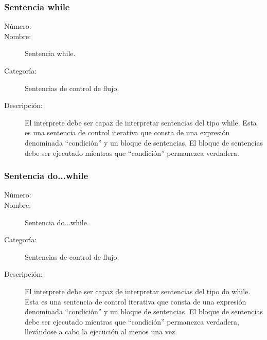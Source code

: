 \subsubsection{Sentencia while}
\begin{framed}
	\begin{description}
		\item [Número:] \cn
		\item [Nombre:] Sentencia while.
		\item [Categoría:] Sentencias de control de flujo.
		\item [Descripción:] El interprete debe ser capaz de interpretar sentencias del tipo while. Esta es una sentencia de control
		iterativa que consta de una expresión denominada ``condición'' y un bloque de sentencias. El bloque de sentencias debe ser ejecutado
	    mientras que ``condición'' permanezca verdadera.
	\end {description}
\end{framed}

\subsubsection{Sentencia do...while}
\begin{framed}
	\begin{description}
		\item [Número:] \cn
		\item [Nombre:] Sentencia do...while.
		\item [Categoría:] Sentencias de control de flujo.
		\item [Descripción:] El interprete debe ser capaz de interpretar sentencias del tipo do while. Esta es una sentencia de control
		iterativa que consta de una expresión denominada ``condición'' y un bloque de sentencias. El bloque de sentencias debe ser ejecutado
	    mientras que ``condición'' permanezca verdadera, llevándose a cabo la ejecución al menos una vez.
	\end {description}
\end{framed}

